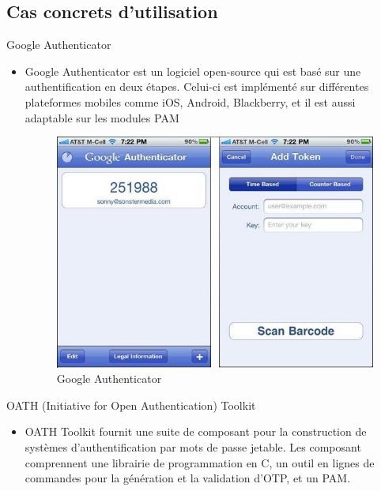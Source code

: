 \documentclass{../res/univ-projet}
\begin{document}
  \subsection{Cas concrets d'utilisation}
  Google Authenticator
  \begin{itemize}
    \item Google Authenticator est un logiciel open-source qui est basé sur une authentification en deux étapes. Celui-ci est implémenté sur différentes plateformes 
	  mobiles comme iOS, Android, Blackberry, et il est aussi adaptable sur les modules PAM
	  \begin{figure}[h!]
	    \centerline{\includegraphics[scale=0.45]{GoogleAuthenticator_2.jpg}}
	    \caption{Google Authenticator}
	  \end{figure}  
  \end{itemize}
  \newpage
  OATH (Initiative for Open Authentication) Toolkit
  \begin{itemize}
    \item OATH Toolkit fournit une suite de composant pour la construction de systèmes d'authentification par mots de passe jetable. 
	  Les composant comprennent une librairie de programmation en C, un outil en lignes de commandes pour la génération et la validation d'OTP, et un PAM.
  \end{itemize}
  
\end{document}
